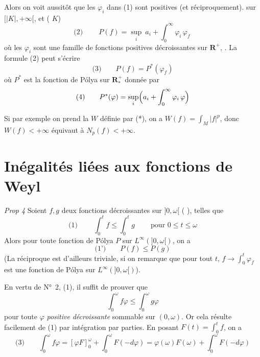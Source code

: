 \documentclass[11pt,a4paper]{article}
\begin{document}
Alors on voit aussitôt que les $\varphi_i$ dans (1) sont positives (et réciproquement).  \struck{\ill{}}   sur $[|K|, +\infty[$, et \struck{\ill{}} \ill{} (\ill{}  $K$) \ill{}  \ill{}
\[
  \text{(2)}\qquad \boxed{\ P(f) = \sup_i\ a_i + \int_0^{\infty} \varphi_i\,\varphi_f\ }
\]
où les $\varphi_i$ sont une famille de fonctions positives décroissantes  sur $\mathbf{R}^{+}$, \struck{\ill{}} . La formule (2) peut s'écrire
\[
  \text{(3)}\qquad P(f) = P^{*}(\varphi_f)
\]
où $P^{*}$ est la fonction de Pólya sur $\mathbf{R}^{+}_{*}$ donnée par
\[
  \text{(4)}\qquad P^{*}(\varphi) = \sup_i \Bigl( a_i + \int_0^{\infty} \varphi_i\,\varphi \Bigr)
\]

Si par exemple on prend la $W$ définie par (*),  on a $W(f) = \int_M |f|^p$, donc $W(f) < +\infty$ équivaut à $N_p(f) < +\infty$.

\section{Inégalités liées aux fonctions de Weyl}


 

\emph{Prop 4} Soient $f, g$ deux fonctions décroissantes  sur $]0, \omega[$ ( \ill{}), telles que
\[
  \text{(1)}\qquad \boxed{\ \int_0^t f \leq \int_0^t g\ } \qquad\text{pour } 0 \leq t \leq \omega
\]
Alors pour toute fonction de Pólya   $P$ sur $L^\infty(]0, \omega[)$, on a
\[
  \text{(1')}\qquad P(f) \leq P(g)
\]
 (La réciproque est d'ailleurs triviale, si on remarque que pour tout $t$, $f \to \int_0^t \varphi_f$ est une fonction de Pólya sur $L^\infty(]0, \omega[)$).

En vertu de N°~2, (1), il suffit de prouver que
\[
  \int_0^\omega f\varphi \leq \int_0^\omega g\varphi
\]
pour toute $\varphi$ \emph{positive} \emph{décroissante} sommable sur $(0, \omega)$. Or cela résulte facilement de (1) par intégration par parties. En posant $F(t) = \int_0^t f$, on a
\[
  \text{(3)}\qquad \int_0^\omega f\varphi = [\varphi F]_0^\omega + \int_0^\omega F(-d\varphi) = \varphi(\omega)F(\omega) + \int_0^\omega F(-d\varphi)
\]
\end{document}

